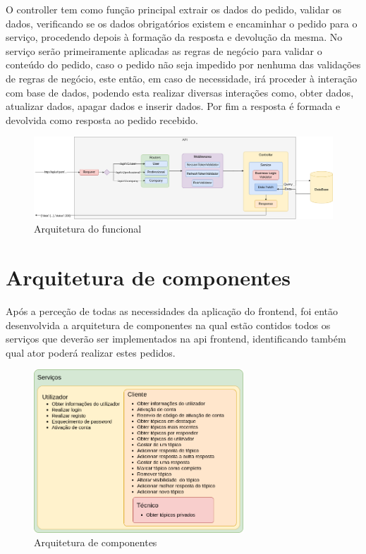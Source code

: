 O controller tem como função principal extrair os dados do pedido, validar os dados, verificando 
se os dados obrigatórios existem e encaminhar o pedido para o serviço, procedendo depois à formação 
da resposta e devolução da mesma. No serviço serão primeiramente aplicadas as regras de negócio para 
validar o conteúdo do pedido, caso o pedido não seja impedido por nenhuma das validações de 
regras de negócio, este então, em caso de necessidade, irá proceder à interação com base de dados, 
podendo esta realizar diversas interações como, obter dados, atualizar dados, apagar dados e inserir 
dados. Por fim a resposta é formada e devolvida como resposta ao pedido recebido.

\begin{figure}[htb]
    \centering
    \includegraphics[width=\textwidth]{images/Arquiteturas/arquitetura_funcional.png}
    \caption{Arquitetura do funcional}
    \label{fig:47}
\end{figure}

\newpage

\section{Arquitetura de componentes}
Após a perceção de todas as necessidades da aplicação do frontend, foi então desenvolvida a 
arquitetura de componentes na qual estão contidos todos os serviços que deverão ser implementados na 
api frontend, identificando também qual ator poderá realizar estes pedidos.

\begin{figure}[htb]
    \centering
    \includegraphics[width=0.7\textwidth]{images/Arquiteturas/arquitetura_de_componentes_final.png}
    \caption{Arquitetura de componentes}
    \label{fig:48}
\end{figure}

